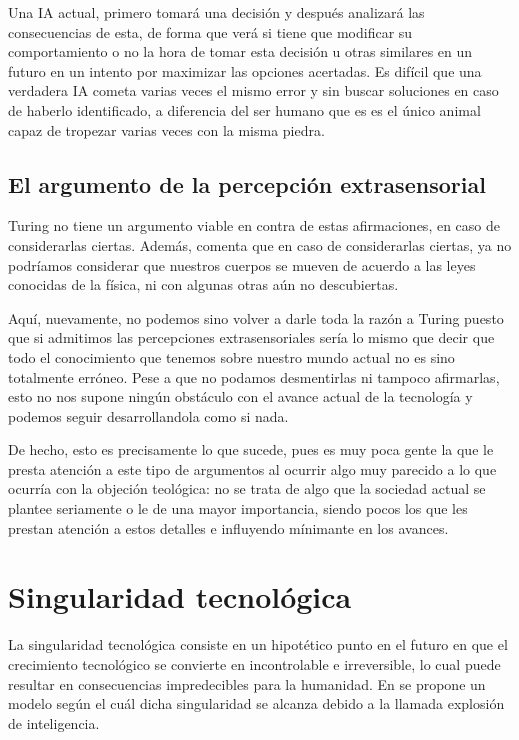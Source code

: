 \documentclass[12pt,a4paper]{article}
\begin{document}
Una IA actual, primero tomará una decisión y después analizará las consecuencias de esta, de forma que verá si tiene que modificar su comportamiento o no la hora de tomar esta decisión u otras similares en un futuro en un intento por maximizar las opciones acertadas. Es difícil que una verdadera IA cometa varias veces el mismo error y sin buscar soluciones en caso de haberlo identificado, a diferencia del ser humano que es es el único animal capaz de tropezar varias veces con la misma piedra.

\subsection{El argumento de la percepción extrasensorial}
Turing no tiene un argumento viable en contra de estas afirmaciones, en caso de considerarlas ciertas. Además, comenta que en caso de considerarlas ciertas, ya no podríamos considerar que nuestros cuerpos se mueven de acuerdo a las leyes conocidas de la física, ni con algunas otras aún no descubiertas.

Aquí, nuevamente, no podemos sino volver a darle toda la razón a Turing puesto que si admitimos las percepciones extrasensoriales sería lo mismo que decir que todo el conocimiento que tenemos sobre nuestro mundo actual no es sino totalmente erróneo. Pese a que no podamos desmentirlas ni tampoco afirmarlas, esto no nos supone ningún obstáculo con el avance actual de la tecnología y podemos seguir desarrollandola como si nada.

De hecho, esto es precisamente lo que sucede, pues es muy poca gente la que le presta atención a este tipo de argumentos al ocurrir algo muy parecido a lo que ocurría con la objeción teológica: no se trata de algo que la sociedad actual se plantee seriamente o le de una mayor importancia, siendo pocos los que les prestan atención a estos detalles e influyendo mínimante en los avances.

\section{Singularidad tecnológica}

La singularidad tecnológica consiste en un hipotético punto en el futuro en que el crecimiento tecnológico se convierte en incontrolable e irreversible, lo cual puede resultar en consecuencias impredecibles para la humanidad. En \cite{Speculations} se propone un modelo según el cuál dicha singularidad se alcanza debido a la llamada explosión de inteligencia.
\end{document}
